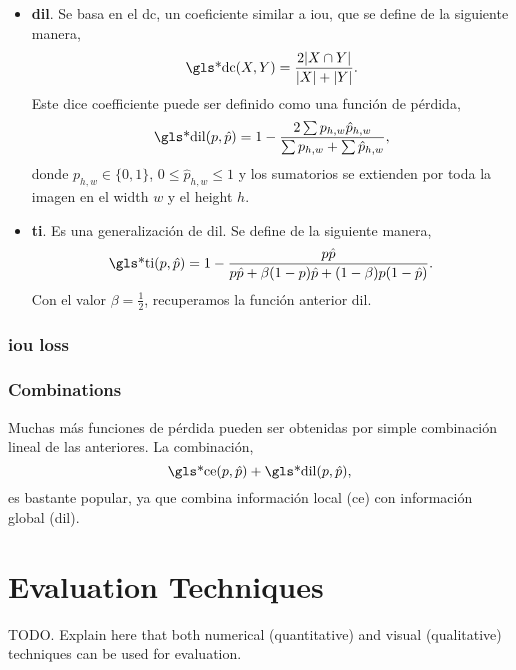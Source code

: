 \begin{itemize}
  \item \textbf{\gls*{dil}}. Se basa en el \gls{dc}, un coeficiente similar a
  \gls{iou}, que se define de la siguiente manera,
  \begin{equation}
    \text{\gls*{dc}}(X, Y) = \frac{2|X \cap Y|}{|X| + |Y|}.
  \end{equation}
  Este dice coefficiente puede ser definido como una función de pérdida,
  \begin{equation}
    \text{\gls*{dil}}(p, \hat{p})
    = 1 - \frac{2\sum p_{h, w}\hat{p}_{h, w}}{\sum p_{h, w} + \sum \hat{p}_{h, w}},
  \end{equation}
  donde \(p_{h, w} \in \{0, 1\}\), \(0 \leq \hat{p}_{h, w} \leq 1\) y los
  sumatorios se extienden por toda la imagen en el width \(w\) y el height
  \(h\).
  \item \textbf{\gls*{ti}}. Es una generalización de \gls{dil}. Se define de la
  siguiente manera,
  \begin{equation}
    \text{\gls*{ti}}(p, \hat{p})
    = 1 - \frac{p\hat{p}}{p\hat{p} + \beta(1 - p)\hat{p} + (1 - \beta)p(1 - \hat{p})}.
  \end{equation}
  Con el valor \(\beta = \frac{1}{2}\), recuperamos la función anterior
  \gls{dil}.
\end{itemize}


\subsubsection{\gls*{iou} loss}

\cite{yu16:unitb}

\subsubsection{Combinations}
Muchas más funciones de pérdida pueden ser obtenidas por simple combinación
lineal de las anteriores. La combinación,
\begin{equation}
  \text{\gls*{ce}}(p, \hat{p}) + \text{\gls*{dil}}(p, \hat{p}),
\end{equation}
es bastante popular, ya que combina información local (\gls{ce}) con
información global (\gls{dil}).


\section{Evaluation Techniques} \label{sec:eval-measure}

TODO. Explain here that both numerical (quantitative) and visual (qualitative)
techniques can be used for evaluation.

